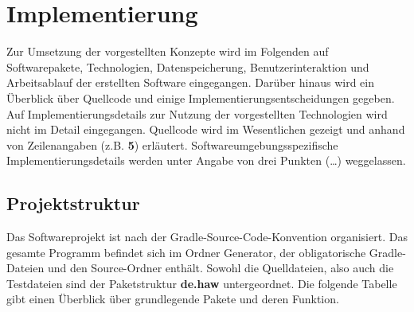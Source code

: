 
\chapter{Implementierung}
Zur Umsetzung der vorgestellten Konzepte wird im Folgenden auf Softwarepakete, Technologien, Datenspeicherung,
Benutzerinteraktion und Arbeitsablauf der erstellten Software eingegangen.
Darüber hinaus wird ein Überblick über Quellcode und einige Implementierungsentscheidungen gegeben.
Auf Implementierungsdetails zur Nutzung der vorgestellten Technologien wird nicht im Detail eingegangen.
Quellcode wird im Wesentlichen gezeigt und anhand von Zeilenangaben (z.B. \textbf{5}) erläutert.
Softwareumgebungsspezifische Implementierungsdetails werden unter Angabe von drei Punkten (\ldots) weggelassen.

\section{Projektstruktur}
Das Softwareprojekt ist nach der Gradle-Source-Code-Konvention organisiert.
Das gesamte Programm befindet sich im Ordner Generator, der obligatorische Gradle-Dateien und den
Source-Ordner enthält.
Sowohl die Quelldateien, also auch die Testdateien sind der Paketstruktur \textbf{de.haw} untergeordnet.
Die folgende Tabelle gibt einen Überblick über grundlegende Pakete und deren Funktion.

